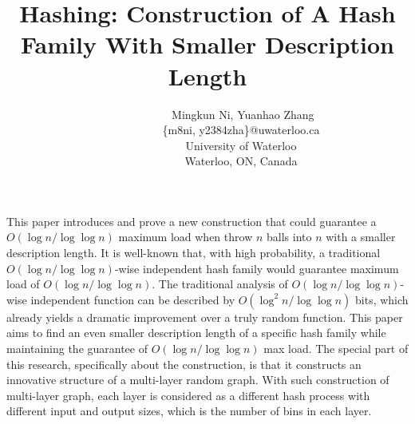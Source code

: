 \documentclass[a4paper, english]{paper}
\renewenvironment{abstract}
 {
  \begin{center}
  \bfseries \abstractname\vspace{-.5em}\vspace{0pt}
  \end{center}
  \list{}{
    \setlength{\leftmargin}{1cm}%
    \setlength{\rightmargin}{\leftmargin}%
  }%
  \item\relax}
 {\endlist}
\begin{document}
\selectfont

	\title{Hashing: Construction of A Hash Family With Smaller Description Length}
	\author{$\qquad$$\qquad$$\qquad$ Mingkun Ni, Yuanhao Zhang\\
		$\qquad$$\qquad$$\qquad$\{m8ni, y2384zha\}@uwaterloo.ca\\
		$\qquad$$\qquad$$\qquad$University of Waterloo\\
		$\qquad$$\qquad$$\qquad$Waterloo, ON, Canada\\
	}
	\maketitle
	
	\vspace{0.3cm}
	\begin{abstract}
	This paper introduces and prove a new construction that could guarantee a $O(\log n/\log\log n)$ maximum load when throw $n$ balls into $n$ with a smaller description length. It is well-known that, with high probability, a traditional $O(\log n/\log\log n)$-wise independent hash family would guarantee maximum load of $O(\log n/\log\log n)$. The traditional analysis of $O(\log n/\log\log n)$-wise independent function can be described by $O(\log^2 n/\log\log n)$ bits, which already yields a dramatic improvement over a truly random function. This paper aims to find an even smaller description length of a specific hash family while maintaining the guarantee of $O(\log n/\log\log n)$ max load. The special part of this research, specifically about the construction, is that it constructs an innovative structure of a multi-layer random graph. With such construction of multi-layer graph, each layer is considered as a different hash process with different input and output sizes, which is the number of bins in each layer.
	\end{abstract}
	\vspace{0.3cm}
\end{document}
